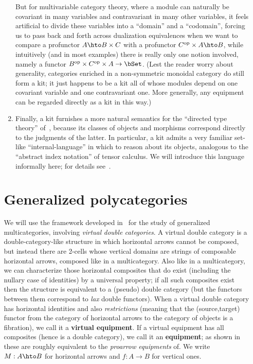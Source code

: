 \documentclass{amsart}
\begin{document}
\begin{enumerate}
  But for multivariable category theory, where a module can naturally be covariant in many variables and contravariant in many other variables, it feels artificial to divide these variables into a ``domain'' and a ``codomain'', forcing us to pass back and forth across dualization equivalences when we want to compare a profunctor $A \hto B\times C$ with a profunctor $C\op\times A \hto B$, while intuitively (and in most examples) there is really only one notion involved, namely a functor $B\op \times C\op \times A \to \bSet$.
  (Lest the reader worry about generality, categories enriched in a non-symmetric monoidal category do still form a kit; it just happens to be a kit all of whose modules depend on one covariant variable and one contravariant one.
  More generally, any equipment can be regarded directly as a kit in this way.)
\item Finally, a kit furnishes a more natural semantics for the ``directed type theory'' of~\cite{lnss:dirtt}, because its classes of objects and morphisms correspond directly to the judgments of the latter.
  In particular, a kit admits a very familiar set-like ``internal-language'' in which to reason about its objects, analogous to the ``abstract index notation'' of tensor calculus.
  We will introduce this language informally here; for details see~\cite{lnss:dirtt}.
\end{enumerate}



\section{Generalized polycategories}
\label{sec:genpoly}

We will use the framework developed in~\cite{cs:multicats} for the study of generalized multicategories, involving \emph{virtual double categories}.
A virtual double category is a double-category-like structure in which horizontal arrows cannot be composed, but instead there are 2-cells whose vertical domains are strings of composable horizontal arrows, composed like in a multicategory.
Also like in a multicategory, we can characterize those horizontal composites that do exist (including the nullary case of identities) by a universal property; if all such composites exist then the structure is equivalent to a (pseudo) double category (but the functors between them correspond to \emph{lax} double functors).
When a virtual double category has horizontal identities and also \emph{restrictions} (meaning that the (source,target) functor from the category of horizontal arrows to the category of objects is a fibration), we call it a \textbf{virtual equipment}.
If a virtual equipment has all composites (hence is a double category), we call it an \textbf{equipment}; as shown in~\cite{shulman:frbi} these are roughly equivalent to the \emph{proarrow equipments} of\cite{wood:proarrows-i}.
We write $M:A\hto B$ for horizontal arrows and $f:A\to B$ for vertical ones.
\end{document}
